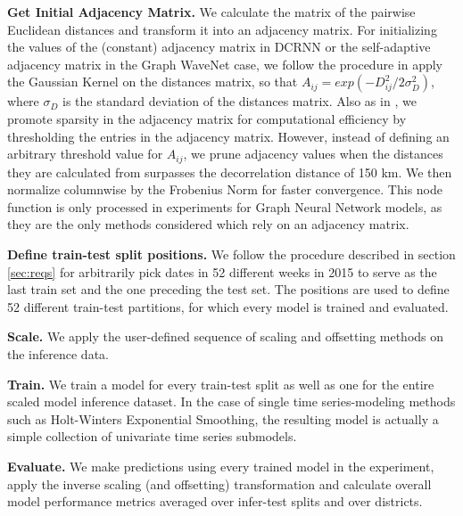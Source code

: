 \vspace{1em}
\noindent
\textbf{Get Initial Adjacency Matrix.}  We calculate the matrix of the pairwise Euclidean distances and transform it into an adjacency matrix.
For initializing the values of the (constant) adjacency matrix in DCRNN or the self-adaptive adjacency matrix in the Graph WaveNet case, we follow the procedure in \cite{li2018dcrnn, wu2019graphwavenet} apply the Gaussian Kernel on the distances matrix, so that $A_{ij} = exp(-D_{ij}^2/2\sigma_{D}^2)$, where $\sigma_{D}$ is the standard deviation of the distances matrix.
Also as in \cite{li2018dcrnn}, we promote sparsity in the adjacency matrix for computational efficiency by thresholding the entries in the adjacency matrix.
However, instead of defining an arbitrary threshold value for $A_{ij}$, we prune adjacency values when the distances they are calculated from surpasses the decorrelation distance of 150 km.
We then normalize columnwise by the Frobenius Norm for faster convergence.
This node function is only processed in experiments for Graph Neural Network models, as they are the only methods considered which rely on an adjacency matrix.

\vspace{1em}
\noindent
\textbf{Define train-test split positions.} We follow the procedure described in section \ref{sec:reqs} for arbitrarily pick dates in 52 different weeks in 2015 to serve as the last train set and the one preceding the test set.
The positions are used to define 52 different train-test partitions, for which every model is trained and evaluated.

\vspace{1em}
\noindent
\textbf{Scale.}  We apply the user-defined sequence of scaling and offsetting methods on the inference data.

\vspace{1em}
\noindent
\textbf{Train.}  We train a model for every train-test split as well as one for the entire scaled model inference dataset.
In the case of single time series-modeling methods such as Holt-Winters Exponential Smoothing, the resulting model is actually a simple collection of univariate time series submodels.

\vspace{1em}
\noindent
\textbf{Evaluate.}  We make predictions using every trained model in the experiment, apply the inverse scaling (and offsetting) transformation and calculate overall model performance metrics averaged over infer-test splits and over districts.